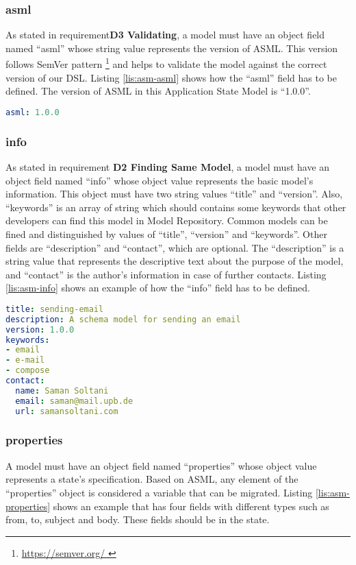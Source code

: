 \subsubsection{asml}
As stated in requirement\textbf{D3 Validating}, a model must have an object field named “asml” whose string value represents the version of ASML. This version follows SemVer pattern \footnote{\href{https://semver.org/}{https://semver.org/
}} and helps to validate the model against the correct version of our DSL. Listing \ref{lis:asm-asml} shows how the “asml” field has to be defined. The version of ASML in this Application State Model is “1.0.0”.

\lstset{
  label=lis:asm-asml, caption=Application State Model “asml” field example., 
}
\begin{lstlisting}[language=yaml]
asml: 1.0.0
\end{lstlisting}
\subsubsection{info}
As stated in requirement \textbf{D2 Finding Same Model}, a model must have an object field named “info” whose object value represents the basic model’s information. This object must have two string values “title” and “version”. Also, “keywords” is an array of string which should contains some keywords that other developers can find this model in Model Repository. Common models can be fined and distinguished by values of “title”, “version” and  “keywords”. Other fields are “description” and “contact”, which are optional. The “description” is a string value that represents the descriptive text about the purpose of the model, and “contact” is the author’s information in case of further contacts. Listing \ref{lis:asm-info} shows an example of how the “info” field has to be defined.

\lstset{
  label=lis:asm-info, caption=Application State Model “info” field example. 
}
\begin{lstlisting}[language=yaml]
title: sending-email
description: A schema model for sending an email
version: 1.0.0
keywords:
- email
- e-mail
- compose
contact:
  name: Saman Soltani
  email: saman@mail.upb.de
  url: samansoltani.com

\end{lstlisting}

\subsubsection{properties}
A model must have an object field named “properties” whose object value represents a state’s specification. Based on ASML, any element of the “properties” object is considered a variable that can be migrated.
Listing \ref{lis:asm-properties} shows an example that has four fields with different types such as from, to, subject and body. These fields should be in the state.

